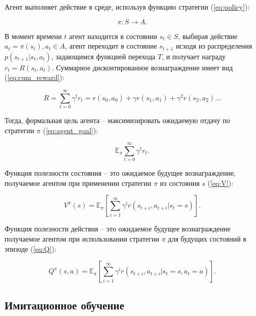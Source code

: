         Агент выполняет действие в среде, используя функцию стратегии (\ref{eq:policy}): 

        \begin{equation}
            \pi: S \to A.
            \label{eq:policy}
        \end{equation}

        В момент времени $t$ агент находится в состоянии $s_t \in S$, выбирая действие $a_t = \pi(s_t), a_t \in A$, агент переходит в состояние $s_{t + 1}$ исходя из распределения $p(s_{t + 1} | s_t, a_t)$, задающимся функцией перехода $T$, и получает награду $r_t = R(s_t, a_t)$. Суммарное дисконтированное вознаграждение имеет вид (\ref{eq:cum_reward}): 

        \begin{equation}
            R = \sum_{t = 0}^\infty  \gamma^t r_t = r(s_0, a_0) + \gamma r(s_1, a_1) + \gamma^2 r(s_2, a_2) \dots
            \label{eq:cum_reward}
        \end{equation}

        Тогда, формальная цель агента -- максимизировать ожидаемую отдачу по стратегии $\pi$ (\ref{eq:agent_goal}):

        \begin{equation}
            \mathbb{E}_{\pi} \sum_{t = 0}^\infty \gamma^t r_t.
            \label{eq:agent_goal}
        \end{equation}

        Функция полезности состояния -- это ожидаемое будущее вознаграждение, получаемое агентом при применении стратегии $\pi$ из состояния $s$ (\ref{eq:V}):

        \begin{equation}
            V^{\pi} (s) = \mathbb{E}_{\pi} \left[ \sum_{i = 1}^{\infty} \gamma^i r(s_{t + i}, a_{t + i} | s_t = s) \right].
            \label{eq:V}
        \end{equation}

        Функция полезности действия -- это ожидаемое будущее вознаграждение получаемое агентом при использовании стратегии $\pi$ для будущих состояний в эпизоде (\ref{eq:Q}):

        \begin{equation}
            Q^{\pi} (s, a) = \mathbb{E}_{\pi} \left[ \sum_{i = 1}^{\infty} \gamma^i r(s_{t + i}, a_{t + i} | s_t = s, a_t = a) \right].
            \label{eq:Q}
        \end{equation}

        
    \subsection{Имитационное обучение}

